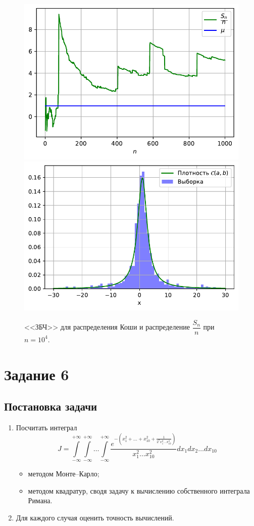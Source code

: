 \documentclass[16pt]{article}
\begin{document}
\begin{figure}[h]
	\center
	\includegraphics[scale=0.5]{5_5.pdf}
	\hfill
	\includegraphics[scale=0.5]{5_6.pdf}
	\caption{<<ЗБЧ>> для распределения Коши и распределение $\dfrac{S_n}{n}$ при $n = 10^4$.}
\end{figure}

\newpage
\section{Задание 6}
\subsection{Постановка задачи}
\begin{enumerate}
\item Посчитать интеграл
$$J = \int\limits_{-\infty}^{+\infty}\int\limits_{-\infty}^{+\infty}\ldots\int\limits_{-\infty}^{+\infty} \dfrac{e^{-\left(x_1^2 + \ldots + x_{10}^2 + \frac{1}{2^7x_1^2\ldots x_{10}^2}\right)}}{x_1^2\ldots x_{10}^2}dx_1dx_2\ldots dx_{10}$$
\begin{itemize}
	\item методом Монте--Карло;
	\item методом квадратур, сводя задачу к вычислению собственного интеграла Римана.
\end{itemize} 
\item Для каждого случая оценить точность вычислений.
\end{enumerate}
\end{document}

